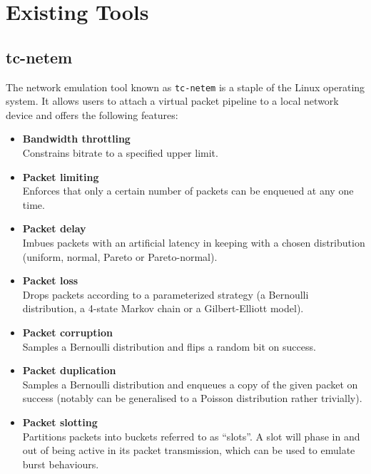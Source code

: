 \section{Existing Tools}

\subsection{tc-netem}

The network emulation tool known as \texttt{tc-netem} is a staple of the Linux operating system\cite{tc_netem_wiki,
    tc_netem_8_man,tc_netem_src}. It allows users to attach a virtual packet pipeline to a local network device and
offers the following features:
\begin{itemize}
    \item \textbf{Bandwidth throttling} \\
    Constrains bitrate to a specified upper limit.
    \item \textbf{Packet limiting} \\
    Enforces that only a certain number of packets can be enqueued at any one time.
    \item \textbf{Packet delay} \\
    Imbues packets with an artificial latency in keeping with a chosen distribution (uniform, normal, Pareto or
    Pareto-normal).
    \item \textbf{Packet loss} \\
    Drops packets according to a parameterized strategy (a Bernoulli distribution, a 4-state Markov chain or a
    Gilbert-Elliott model\cite{ge_model}).
    \item \textbf{Packet corruption} \\
    Samples a Bernoulli distribution and flips a random bit on success.
    \item \textbf{Packet duplication} \\
    Samples a Bernoulli distribution and enqueues a copy of the given packet on success (notably can be generalised to a
    Poisson distribution rather trivially).
    \item \textbf{Packet slotting} \\
    Partitions packets into buckets referred to as ``slots''. A slot will phase in and out of being active in its
    packet transmission, which can be used to emulate burst behaviours.
\end{itemize}

